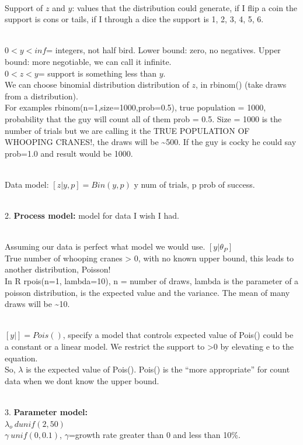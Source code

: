 \documentclass[
]{book}
\begin{document}
\strut \\
Support of \(z\) and \(y\): values that the distribution could generate, if I flip a coin the support is cons or tails, if I through a dice the support is 1, 2, 3, 4, 5, 6.\\
\strut \\
\(0< y < inf\)= integers, not half bird. Lower bound: zero, no negatives. Upper bound: more negotiable, we can call it infinite.\\
\(0 < z < y\)= support is something less than \(y\).\\
We can choose binomial distribution distribution of \(z\), in rbinom() (take draws from a distribution).\\
For examples rbinom(n=1,size=1000,prob=0.5), true population = 1000, probability that the guy will count all of them prob = 0.5. Size = 1000 is the number of trials but we are calling it the TRUE POPULATION OF WHOOPING CRANES!, the draws will be \textasciitilde500. If the guy is cocky he could say prob=1.0 and result would be 1000.\\
\strut \\
Data model:
\([z|y,p]=Bin(y,p)\) y num of trials, p prob of success.\\
\strut \\
2. \textbf{Process model:} model for data I wish I had.\\
\strut \\
Assuming our data is perfect what model we would use. \([y|\theta_P]\)\\
True number of whooping cranes \textgreater{} 0, with no known upper bound, this leads to another distribution, Poisson!\\
In R rpois(n=1, lambda=10), n = number of draws, lambda is the parameter of a poisson distribution, is the expected value and the variance. The mean of many draws will be \textasciitilde10.\\
\strut \\
\([y|]=Pois()\), specify a model that controls expected value of Pois() could be a constant or a linear model. We restrict the support to \textgreater0 by elevating e to the equation.\\
So, \(\lambda\) is the expected value of Pois(). Pois() is the ``more appropriate'' for count data when we dont know the upper bound.\\
\strut \\
3. \textbf{Parameter model:}\\
\(\lambda_o ~ dunif(2, 50)\)\\
\(\gamma ~ unif(0,0.1)\), \(\gamma\)=growth rate greater than 0 and less than 10\%.
\end{document}

